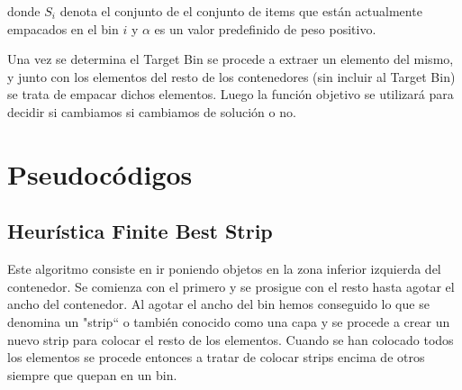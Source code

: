 \documentclass[a4paper,10pt]{article}
\begin{document}
donde $S_i$ denota el conjunto de el conjunto de items que están actualmente empacados en el bin $i$ y $\alpha$ es un valor 
predefinido de peso positivo.

Una vez se determina el Target Bin se procede a extraer un elemento del mismo, y junto con los elementos del resto de los contenedores 
(sin incluir al Target Bin) se trata de empacar dichos elementos. Luego la función objetivo se utilizará para decidir si cambiamos 
si cambiamos de solución o no.

\section{Pseudocódigos}

\subsection{Heurística Finite Best Strip}
Este algoritmo consiste en ir poniendo objetos en la zona inferior izquierda del contenedor. Se comienza con el primero y se prosigue con 
el resto hasta agotar el ancho del contenedor. Al agotar el ancho del bin hemos conseguido lo que se denomina un "strip`` o también conocido 
como una capa y se procede a crear un nuevo strip para colocar el resto de los elementos. Cuando se han colocado todos los elementos 
se procede entonces a tratar de colocar strips encima de otros siempre que quepan en un bin.
\end{document}
